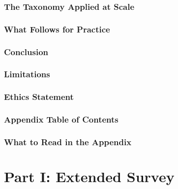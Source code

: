 \documentclass[11pt]{article}
\begin{document}


\section{The Taxonomy Applied at Scale}
\label{sec:applied}
\label{sec:census}



\section{What Follows for Practice}
\label{sec:practice}



\section{Conclusion}



\section*{Limitations}
\label{sec:limitations-anchor}



\section*{Ethics Statement}



\clearpage


\clearpage
\appendix
\startcontents[appendices]
\section*{Appendix Table of Contents}

\section*{What to Read in the Appendix}

\newpage

\part*{Part I: Extended Survey}
\label{app:part-survey}
\end{document}
